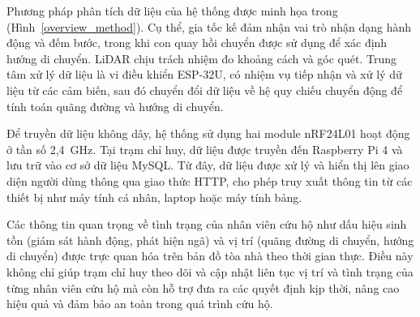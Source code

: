 Phương pháp phân tích dữ liệu của hệ thống được minh họa trong (Hình~\ref{overview_method}). Cụ thể, gia tốc kế đảm nhận vai trò nhận dạng hành động và đếm bước, trong khi con quay hồi chuyển được sử dụng để xác định hướng di chuyển. LiDAR chịu trách nhiệm đo khoảng cách và góc quét. Trung tâm xử lý dữ liệu là vi điều khiển ESP-32U, có nhiệm vụ tiếp nhận và xử lý dữ liệu từ các cảm biến, sau đó chuyển đổi dữ liệu về hệ quy chiếu chuyển động để tính toán quãng đường và hướng di chuyển.

Để truyền dữ liệu không dây, hệ thống sử dụng hai module nRF24L01 hoạt động ở tần số 2,4~GHz. Tại trạm chỉ huy, dữ liệu được truyền đến Raspberry Pi 4 và lưu trữ vào cơ sở dữ liệu MySQL. Từ đây, dữ liệu được xử lý và hiển thị lên giao diện người dùng thông qua giao thức HTTP, cho phép truy xuất thông tin từ các thiết bị như máy tính cá nhân, laptop hoặc máy tính bảng.

Các thông tin quan trọng về tình trạng của nhân viên cứu hộ như dấu hiệu sinh tồn (giám sát hành động, phát hiện ngã) và vị trí (quãng đường di chuyển, hướng di chuyển) được trực quan hóa trên bản đồ tòa nhà theo thời gian thực. Điều này không chỉ giúp trạm chỉ huy theo dõi và cập nhật liên tục vị trí và tình trạng của từng nhân viên cứu hộ mà còn hỗ trợ đưa ra các quyết định kịp thời, nâng cao hiệu quả và đảm bảo an toàn trong quá trình cứu hộ.

